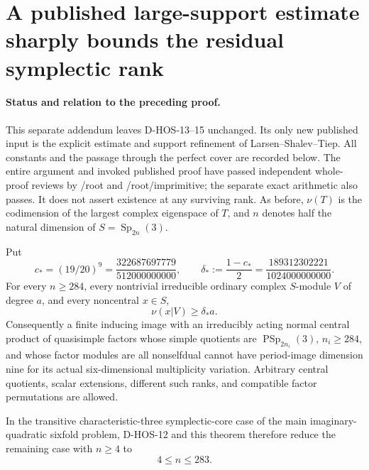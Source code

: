 \section{A published large-support estimate sharply bounds the residual symplectic rank}
\label{sec:symplectic-three-sharp}

\paragraph{Status and relation to the preceding proof.}
This separate addendum leaves D-HOS-13--15 unchanged. Its only new
published input is the explicit estimate and support refinement of
Larsen--Shalev--Tiep. All constants and the passage through the perfect
cover are recorded below. The entire argument and invoked published proof have passed independent
whole-proof reviews by /root and /root/imprimitive; the separate exact
arithmetic also passes. It does not assert existence at any surviving rank.
As before, $\nu(T)$ is the codimension of the largest complex eigenspace
of $T$, and $n$ denotes half the natural dimension of
$S=\operatorname{Sp}_{2n}(3)$.

\begin{theorem}
\label{D-HOS-16}
Put
\[
 c_*=(19/20)^9=\frac{322687697779}{512000000000},\qquad
 \delta_*:=\frac{1-c_*}{2}
          =\frac{189312302221}{1024000000000}.
 \tag{HOS3S.1}
\]
For every $n\ge284$, every nontrivial irreducible ordinary complex
$S$-module $V$ of degree $a$, and every noncentral $x\in S$,
\[
                           \nu(x|V)\ge\delta_*a.
 \tag{HOS3S.2}
\]
Consequently a finite inducing image with an irreducibly acting normal
central product of quasisimple factors whose simple quotients are
$\operatorname{PSp}_{2n_i}(3)$, $n_i\ge284$, and whose factor modules
are all nonselfdual cannot have period-image dimension nine for its
actual six-dimensional multiplicity variation. Arbitrary central
quotients, scalar extensions, different such ranks, and compatible
factor permutations are allowed.

In the transitive characteristic-three symplectic-core case of the
main imaginary-quadratic sixfold problem, D-HOS-12 and this theorem
therefore reduce the remaining case with $n\ge4$ to
\[
                                  4\le n\le283.
 \tag{HOS3S.3}
\]
\end{theorem}

